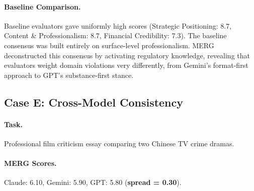 \documentclass{article}
\begin{document}
\paragraph{Baseline Comparison.} Baseline evaluators gave uniformly high scores (Strategic Positioning: 8.7, Content \& Professionalism: 8.7, Financial Credibility: 7.3). The baseline consensus was built entirely on surface-level professionalism. MERG deconstructed this consensus by activating regulatory knowledge, revealing that evaluators weight domain violations very differently, from Gemini's format-first approach to GPT's substance-first stance.

\subsection{Case E: Cross-Model Consistency}
\label{case:cross_model}

\paragraph{Task.} Professional film criticism essay comparing two Chinese TV crime dramas.

\paragraph{MERG Scores.} Claude: 6.10, Gemini: 5.90, GPT: 5.80 (\textbf{spread = 0.30}).
\end{document}
